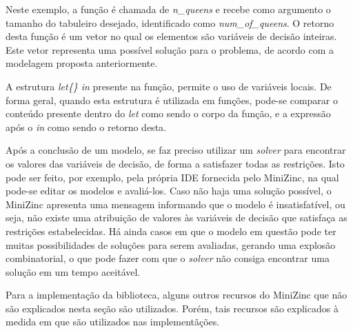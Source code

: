 Neste exemplo, a função é chamada de \textit{n\_queens} e recebe como argumento o tamanho do tabuleiro desejado, identificado como \textit{num\_of\_queens}. O retorno desta função é um vetor no qual os elementos são variáveis de decisão inteiras. Este vetor representa uma possível solução para o problema, de acordo com a modelagem proposta anteriormente.

A estrutura \textit{let\{\} in} presente na função, permite o uso de variáveis locais. De forma geral, quando esta estrutura é utilizada em funções, pode-se comparar o conteúdo presente dentro do \textit{let} como sendo o corpo da função, e a expressão após o \textit{in} como sendo o retorno desta.

Após a conclusão de um modelo, se faz preciso utilizar um \textit{solver} para encontrar os valores das variáveis de decisão, de forma a satisfazer todas as restrições. Isto pode ser feito, por exemplo, pela própria IDE fornecida pelo MiniZinc, na qual pode-se editar os modelos e avaliá-los. Caso não haja uma solução possível, o MiniZinc apresenta uma mensagem informando que o modelo é insatisfatível, ou seja, não existe uma atribuição de valores às variáveis de decisão que satisfaça as restrições estabelecidas. Há ainda casos em que o modelo em questão pode ter muitas possibilidades de soluções para serem avaliadas, gerando uma explosão combinatorial, o que pode fazer com que o \textit{solver} não consiga encontrar uma solução em um tempo aceitável.

Para a implementação da biblioteca, alguns outros recursos do MiniZinc que não são explicados nesta seção são utilizados. Porém, tais recursos são explicados à medida em que são utilizados nas implementãções.